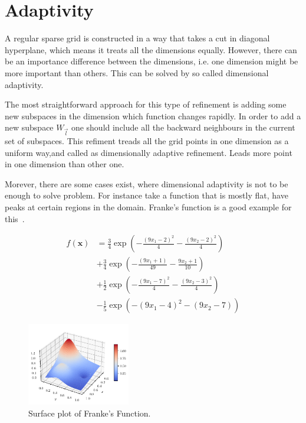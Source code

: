 \section{Adaptivity}

A regular sparse grid is constructed in a way that takes a cut in diagonal hyperplane, which means
it treats all the dimensions equally. However, there can be an importance difference between the dimensions,
i.e. one dimension might be more important than others. This can be solved by so called dimensional adaptivity.

The most straightforward approach for this type of refinement is adding some
new subspaces in the dimension which function changes rapidly. In order to add a new subspace
\(W_{\vec{l}}\) one should include all the backward neighbours in the current set of subspaces.
This refiment treads all the grid points in one dimension as a uniform way,and called as
dimensionally adaptive refinement. Leads more point in one dimension than other one.


Morever, there are some cases exist, where dimensional adaptivity is not to be enough to solve problem.
For instance take a function that is mostly flat, have peaks at certain regions in the domain.
Franke's function is a good example for this~\cite{Franke1979}.

\begin{equation}
    \begin{aligned}
        f(\textbf{x}) & = \frac{3}{4} \exp \left( - \frac{(9x_1-2)^2}{4} - \frac{(9x_2-2)^2}{4} \right) \\
                      & + \frac{3}{4} \exp  \left( - \frac{(9x_1+1)}{49} - \frac{9x_2+1}{10}\right)     \\
                      & + \frac{1}{2} \exp \left( -\frac{(9x_1-7)^2}{4} - \frac{(9x_2-3)^2}{4} \right)  \\
                      & - \frac{1}{5} \exp \left( - (9x_1-4 )^2 -(9x_2-7)\right)
    \end{aligned}
\end{equation}

\begin{figure}
    \centering
    \includegraphics[width=0.4\textwidth]{figures/franke.pdf}
    \caption{Surface plot of Franke's Function.}
    \label{fig:franke}
\end{figure}

